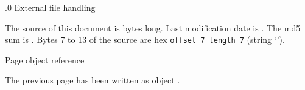 .0 {External file handling}

The source of this document is {\tt\pdffilesize{\jobname}} bytes long. Last modification date
is {\tt\pdffilemoddate{\jobname}}. The md5 sum is {\tt\pdfmdfivesum{\jobname}}.
Bytes 7 to 13 of the source are hex {\tt\pdffiledump offset 7 length 7{\jobname}}
(string `').

\endfeature


\pdfsavepos
{}

\newpage


 {Page object reference}

The previous page has been written as object .

\endfeature

%
%




